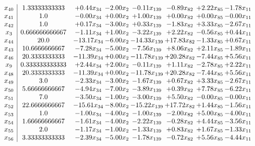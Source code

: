 \documentclass[8pt]{article}
\begin{document}
\[\begin{array}{c| c c@{\hskip 2pt} c@{\hskip 2pt} c@{\hskip 2pt} c@{\hskip 2pt} c@{\hskip 2pt} c@{\hskip 2pt} }
 x_{40}   &  1.33333333333 & +  0.44 x_{34} & -2.00 x_{2} & -0.11 x_{139} & -0.89 x_{82} & +  2.22 x_{85} & -1.78 x_{11}\\
 x_{41}   &  1.0 & -0.00 x_{34} & +  0.00 x_{2} & +  1.00 x_{139} & +  0.00 x_{82} & +  0.00 x_{85} & -0.00 x_{11}\\
 x_{42}   &  1.0 & +  0.17 x_{34} & -3.00 x_{2} & +  0.33 x_{139} & -1.83 x_{82} & +  3.33 x_{85} & -2.67 x_{11}\\
 x_{3}   &  0.666666666667 & -1.11 x_{34} & +  1.00 x_{2} & -3.22 x_{139} & +  2.22 x_{82} & -0.56 x_{85} & +  0.44 x_{11}\\
 x_{44}   &  20.0 & -13.17 x_{34} & -6.00 x_{2} & -14.33 x_{139} & + 17.83 x_{82} & -1.33 x_{85} & +  0.67 x_{11}\\
 x_{43}   &  10.6666666667 & -7.28 x_{34} & -5.00 x_{2} & -7.56 x_{139} & +  8.06 x_{82} & +  2.11 x_{85} & -1.89 x_{11}\\
 x_{46}   &  20.3333333333 & -11.39 x_{34} & +  0.00 x_{2} & -11.78 x_{139} & + 20.28 x_{82} & -7.44 x_{85} & +  5.56 x_{11}\\
 x_{9}   &  0.333333333333 & +  2.44 x_{34} & +  2.00 x_{2} & -0.11 x_{139} & +  1.11 x_{82} & -2.78 x_{85} & +  2.22 x_{11}\\
 x_{48}   &  20.3333333333 & -11.39 x_{34} & +  0.00 x_{2} & -11.78 x_{139} & + 20.28 x_{82} & -7.44 x_{85} & +  5.56 x_{11}\\
 x_{49}   &  3.0 & -2.33 x_{34} & -3.00 x_{2} & -1.67 x_{139} & +  0.67 x_{82} & +  3.33 x_{85} & -2.67 x_{11}\\
 x_{50}   &  5.66666666667 & -4.94 x_{34} & -7.00 x_{2} & -3.89 x_{139} & +  0.39 x_{82} & +  7.78 x_{85} & -6.22 x_{11}\\
 x_{51}   &  7.0 & -3.50 x_{34} & -1.00 x_{2} & -3.00 x_{139} & +  5.50 x_{82} & -0.00 x_{85} & -0.00 x_{11}\\
 x_{52}   &  22.6666666667 & -15.61 x_{34} & -8.00 x_{2} & -15.22 x_{139} & + 17.72 x_{82} & +  1.44 x_{85} & -1.56 x_{11}\\
 x_{53}   &  1.0 & -1.00 x_{34} & -4.00 x_{2} & -1.00 x_{139} & -2.00 x_{82} & +  5.00 x_{85} & -4.00 x_{11}\\
 x_{54}   &  1.66666666667 & -1.61 x_{34} & -4.00 x_{2} & -2.22 x_{139} & -0.28 x_{82} & +  4.44 x_{85} & -3.56 x_{11}\\
 x_{55}   &  2.0 & -1.17 x_{34} & -1.00 x_{2} & -1.33 x_{139} & +  0.83 x_{82} & +  1.67 x_{85} & -1.33 x_{11}\\
 x_{56}   &  3.33333333333 & -2.39 x_{34} & -5.00 x_{2} & -1.78 x_{139} & -0.72 x_{82} & +  5.56 x_{85} & -4.44 x_{11}\\

\end{array}\]
\end{document}
